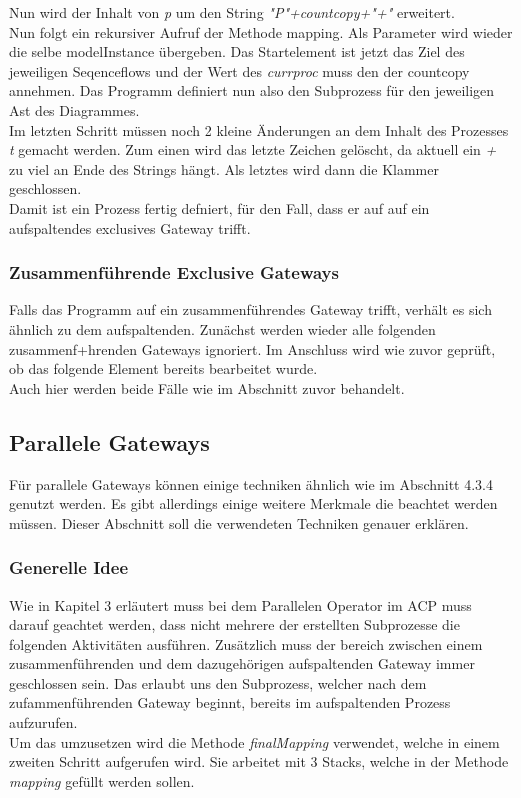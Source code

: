 Nun wird der Inhalt von \textit{p} um den String \textit{"P"+countcopy+"+"} erweitert.\\
Nun folgt ein rekursiver Aufruf der Methode mapping. Als Parameter wird wieder die selbe modelInstance übergeben. Das Startelement ist jetzt das Ziel des jeweiligen Seqenceflows und der Wert des \textit{currproc} muss den der countcopy annehmen. Das Programm definiert nun also den Subprozess für den jeweiligen Ast des Diagrammes.\\
Im letzten Schritt müssen noch 2 kleine Änderungen an dem Inhalt des Prozesses \textit{t} gemacht werden. Zum einen wird das letzte Zeichen gelöscht, da aktuell ein \textit{+} zu viel an Ende des Strings hängt. Als letztes wird dann die Klammer geschlossen.\\
Damit ist ein Prozess fertig defniert, für den Fall, dass er auf auf ein aufspaltendes exclusives Gateway trifft.
\subsubsection{Zusammenführende Exclusive Gateways}
Falls das Programm auf ein zusammenführendes Gateway trifft, verhält es sich ähnlich zu dem aufspaltenden. Zunächst werden wieder alle folgenden zusammenf+hrenden Gateways ignoriert. Im Anschluss wird wie zuvor geprüft, ob das folgende Element bereits bearbeitet wurde.\\
Auch hier werden beide Fälle wie im Abschnitt zuvor behandelt. 
\subsection {Parallele Gateways}
Für parallele Gateways können einige techniken ähnlich wie im Abschnitt 4.3.4 genutzt werden. Es gibt allerdings einige weitere Merkmale die beachtet werden müssen. Dieser Abschnitt soll die verwendeten Techniken genauer erklären.\\
\subsubsection{Generelle Idee}
Wie in Kapitel 3 erläutert muss bei dem Parallelen Operator im ACP muss darauf geachtet werden, dass nicht mehrere der erstellten Subprozesse die folgenden Aktivitäten ausführen. Zusätzlich muss der bereich zwischen einem zusammenführenden und dem dazugehörigen aufspaltenden Gateway immer geschlossen sein. Das erlaubt uns den Subprozess, welcher nach dem zufammenführenden Gateway beginnt, bereits im aufspaltenden Prozess aufzurufen.\\
Um das umzusetzen wird die Methode \textit{finalMapping} verwendet, welche in einem zweiten Schritt aufgerufen wird. Sie arbeitet mit 3 Stacks, welche in der Methode \textit{mapping} gefüllt werden sollen.\\
